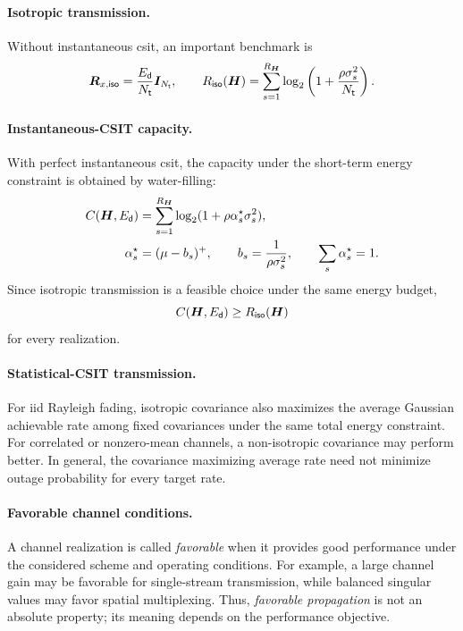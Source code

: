 \paragraph{Isotropic transmission.}
Without instantaneous \ac{csit}, an important benchmark is
\begin{equation}\label{eq:iso}
	\bm{R}_{x,\mathsf{iso}}
	=\frac{E_{\mathsf{d}}}{N_{\mathsf{t}}}\bm{I}_{N_{\mathsf{t}}},
	\qquad
	R_{\mathsf{iso}}(\bm{H})
	=\sum_{s=1}^{R_{\bm{H}}}
	\log_2\left(1+\frac{\rho\sigma_s^2}{N_{\mathsf{t}}}\right).
\end{equation}

\paragraph{Instantaneous-CSIT capacity.}
With perfect instantaneous \ac{csit}, the capacity under the short-term energy constraint is obtained by water-filling:
\begin{align}
	C(\bm{H},E_{\mathsf{d}})
	&=\sum_{s=1}^{R_{\bm{H}}}
	\log_2(1+\rho\alpha_s^\star\sigma_s^2),
	\label{eq:wf}\\
	\alpha_s^\star
	&=(\mu-b_s)^+,
	\qquad
	b_s=\frac{1}{\rho\sigma_s^2},
	\qquad
	\sum_s\alpha_s^\star=1.
	\nonumber
\end{align}
Since isotropic transmission is a feasible choice under the same energy budget,
\begin{equation*}
	C(\bm{H},E_{\mathsf{d}})\geq R_{\mathsf{iso}}(\bm{H})
\end{equation*}
for every realization.

\paragraph{Statistical-CSIT transmission.}
For \ac{iid} Rayleigh fading, isotropic covariance also maximizes the average Gaussian achievable rate among fixed covariances under the same total energy constraint. For correlated or nonzero-mean channels, a non-isotropic covariance may perform better. In general, the covariance maximizing average rate need not minimize outage probability for every target rate.

\paragraph{Favorable channel conditions.}
A channel realization is called \emph{favorable} when it provides good performance under the considered scheme and operating conditions. For example, a large channel gain may be favorable for single-stream transmission, while balanced singular values may favor spatial multiplexing. Thus, \emph{favorable propagation} is not an absolute property; its meaning depends on the performance objective.



